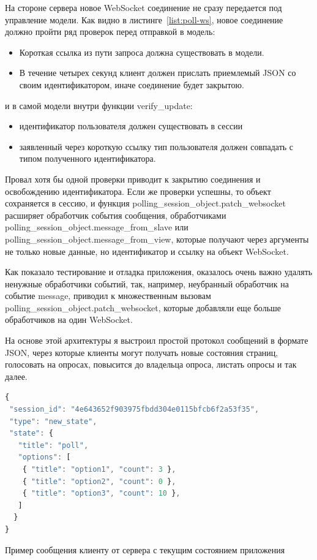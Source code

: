 На стороне сервера новое WebSocket соединение не сразу передается под управление модели. Как видно в листинге~\ref{list:poll-ws}, новое соединение должно пройти ряд проверок перед отправкой в модель:
   \begin{itemize}
   	\item Короткая ссылка из пути запроса должна существовать в модели.
   	\item В течение четырех секунд клиент должен прислать приемлемый JSON со своим идентификатором, иначе соединение будет закрытою.
   \end{itemize}
и в самой модели внутри функции verify\_update:
    \begin{itemize}
 	\item идентификатор пользователя должен существовать в сессии 
 	\item заявленный через короткую ссылку тип пользователя должен совпадать с типом полученного идентификатора.
 	\end{itemize}
Провал хотя бы одной проверки приводит к закрытию соединения и освобождению идентификатора. Если же проверки успешны, то объект сохраняется в сессию, и функция  polling\_session\_object.patch\_websocket расширяет обработчик события сообщения, обработчиками polling\_session\_object.message\_from\_slave или polling\_session\_object.message\_from\_view, которые получают через аргументы не только новые данные, но идентификатор и ссылку на объект WebSocket.

Как показало тестирование и отладка приложения, оказалось очень важно удалять ненужные обработчики событий, так, например, неубранный обработчик на событие message, приводил к множественным вызовам  polling\_session\_object.patch\_websocket, которые добавляли еще больше обработчиков на один WebSocket. 

На основе этой архитектуры я выстроил простой протокол сообщений в формате JSON, через которые клиенты могут получать новые состояния страниц, голосовать на опросах, повысится до владельца опроса, листать опросы и так далее.
 \begin{ListingEnv}[H]
 	\begin{lstlisting}[language=JavaScript]
{
 "session_id": "4e643652f903975fbdd304e0115bfcb6f2a53f35",
 "type": "new_state",
 "state": {
   "title": "poll",
   "options": [
	{ "title": "option1", "count": 3 },
	{ "title": "option2", "count": 0 },
	{ "title": "option3", "count": 10 },
   ]
  }
}
 	\end{lstlisting}
 	\caption{Пример сообщения клиенту от сервера с текущим состоянием приложения}
 	\label{list:message-ws}
 \end{ListingEnv}

